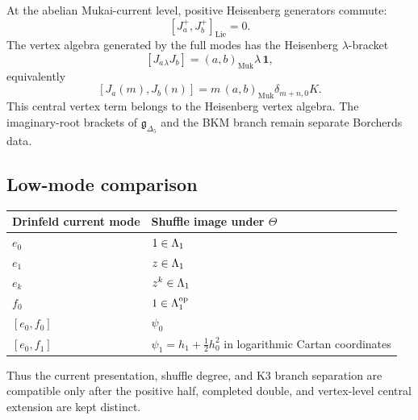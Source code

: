 At the abelian Mukai-current level, positive Heisenberg generators
commute:
\[
  [J_a^+,J_b^+]_{\mathrm{Lie}}=0 .
\]
The vertex algebra generated by the full modes has the Heisenberg
\(\lambda\)-bracket
\[
  [J_a{}_\lambda J_b]=(a,b)_{\mathrm{Muk}}\lambda\,\mathbf 1 ,
\]
equivalently
\[
  [J_a(m),J_b(n)]
  =
  m\,(a,b)_{\mathrm{Muk}}\delta_{m+n,0}K .
\]
This central vertex term belongs to the Heisenberg vertex algebra.  The
imaginary-root brackets of \(\mathfrak g_{\Delta_5}\) and the BKM branch
remain separate Borcherds data.

\subsection{Low-mode comparison}

\begin{center}
\begin{tabular}{l|l}
\textbf{Drinfeld current mode} & \textbf{Shuffle image under \(\Theta\)} \\\hline
\(e_0\) & \(1\in\Lambda_1\) \\
\(e_1\) & \(z\in\Lambda_1\) \\
\(e_k\) & \(z^k\in\Lambda_1\) \\
\(f_0\) & \(1\in\Lambda_1^{\mathrm{op}}\) \\
\([e_0,f_0]\) & \(\psi_0\) \\
\([e_0,f_1]\) & \(\psi_1=h_1+\tfrac12h_0^2\) in logarithmic Cartan coordinates
\end{tabular}
\end{center}

Thus the current presentation, shuffle degree, and K3 branch
separation are compatible only after the positive half, completed
double, and vertex-level central extension are kept distinct.
